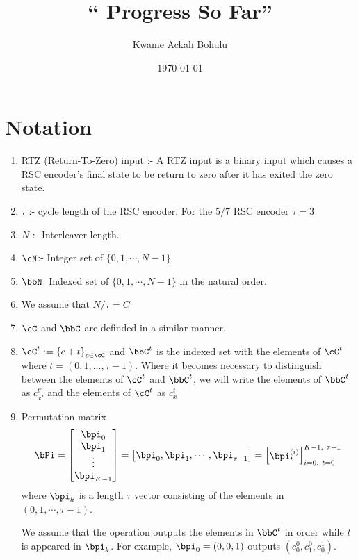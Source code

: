 \documentclass[11pt, oneside, dvipdfmx]{book}
\title{``
Progress So Far'' }
\author{Kwame Ackah Bohulu}
\date{\today}
\begin{document}
\maketitle
\section{Notation}
\begin{enumerate}
\item RTZ (Return-To-Zero) input :- A RTZ input is a binary input which causes a RSC encoder's final state to be return to zero after it has exited the zero state.

\item $\tau$ :- cycle length of the RSC encoder. For the $5/7$ RSC encoder $\tau = 3$

\item $N$ :- Interleaver length. 

\item $\cN$:- Integer set of $\{0,1,\cdots,N-1\}$

\item $\bbN$: Indexed set  of $\{0,1,\cdots,N-1\}$ in the natural order.

\item We assume that $N/\tau=C$

\item $\cC$ and $\bbC$ are definded in a similar manner.

\item $\cC^{t}:=\left\{c+t\right\}_{c \in \cC}$ and $\bbC^t$ is the indexed set with the elements of $\cC^t$ where  $t=(0,1,...,\tau-1)$. Where it becomes necessary to distinguish between the elements of $\cC^{t}$ and $\bbC^{t}$, we will write the elements of $\bbC^{t}$ as $c_{x'}^{t'}$ and the elements of $\cC^{t}$ as $c_x^{t}$

\item Permutation matrix 
\begin{equation}
\bPi = \begin{bmatrix}
\bpi_0\cr
\bpi_1\cr
\vdots\cr
\bpi_{K-1}
\end{bmatrix}
= \begin{bmatrix}
\bpi_0 , \bpi_1,\cdots,\bpi_{\tau-1}
\end{bmatrix}
= \begin{bmatrix}
\bpi_{t}^{(i)}
\end{bmatrix}_{i=0,~t=0}^{K-1,~\tau -1}
\end{equation}
where $\bpi_k$ is a length $\tau$ vector consisting of the elements in $(0,1,\cdots,\tau-1)$. 

We assume that the operation outputs the elements in $\bbC^t$ in order while $t$ is appeared in $\bpi_k$. For example, $\bpi_0 = (0,0,1)$ outputs $(c_0^0,c_1^0,c_0^1)$.
\end{enumerate}
\end{document}
